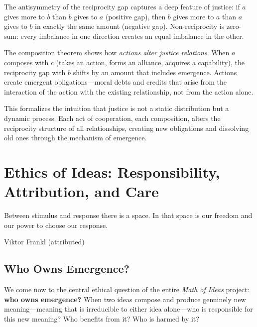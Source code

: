 \begin{interpretation}
The antisymmetry of the reciprocity gap captures a deep feature of justice:
if $a$ gives more to $b$ than $b$ gives to $a$ (positive gap), then $b$ gives
more to $a$ than $a$ gives to $b$ in exactly the same amount (negative gap).
Non-reciprocity is zero-sum: every imbalance in one direction creates an
equal imbalance in the other.

The composition theorem shows how \emph{actions alter justice relations}.
When $a$ composes with $c$ (takes an action, forms an alliance, acquires a
capability), the reciprocity gap with $b$ shifts by an amount that includes
emergence. Actions create emergent obligations---moral debts and credits that
arise from the interaction of the action with the existing relationship, not
from the action alone.

This formalizes the intuition that justice is not a static distribution but
a dynamic process. Each act of cooperation, each composition, alters the
reciprocity structure of all relationships, creating new obligations and
dissolving old ones through the mechanism of emergence.
\end{interpretation}



\chapter{Ethics of Ideas: Responsibility, Attribution, and Care}
\label{ch:ethics-of-ideas}

\epigraph{Between stimulus and response there is a space. In that space is our freedom and our power to choose our response.}{Viktor Frankl (attributed)}

\section{Who Owns Emergence?}

We come now to the central ethical question of the entire \emph{Math of Ideas}
project: \textbf{who owns emergence?} When two ideas compose and produce
genuinely new meaning---meaning that is irreducible to either idea alone---who
is responsible for this new meaning? Who benefits from it? Who is harmed by it?


